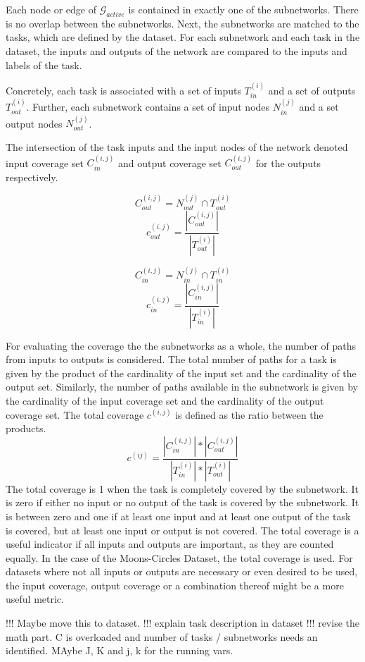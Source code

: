 Each node or edge of $\mathcal{G}_{active}$ is contained in exactly one of the subnetworks.
There is no overlap between the subnetworks.
Next, the subnetworks are matched to the tasks, which are defined by the dataset.
For each subnetwork and each task in the dataset, the inputs and outputs of the network are compared to the inputs and labels of the task.

Concretely, each task is associated with a set of inputs $T^{(i)}_{in}$ and a set of outputs $T^{(i)}_{out}$.
Further, each subnetwork contains a set of input nodes $N^{(j)}_{in}$ and a set output nodes $N^{(j)}_{out}$.

The intersection of the task inputs and the input nodes of the network denoted input coverage set $C^{(i,j)}_{in}$ and output coverage set $C^{(i,j)}_{out}$ for the outputs respectively.

\[
C^{(i,j)}_{out} = N^{(j)}_{out} \cap T^{(i)}_{out}
\]
\[
c^{(i,j)}_{out} = \frac{| C^{(i,j)}_{out} |}{|T^{(i)}_{out}|}
\]

\[
C^{(i,j)}_{in}  = N^{(j)}_{in}  \cap T^{(i)}_{in}
\]
\[
c^{(i,j)}_{in} = \frac{| C^{(i,j)}_{in} |}{|T^{(i)}_{in}|}
\]

For evaluating the coverage the the subnetworks as a whole, the number of paths from inputs to outputs is considered.
The total number of paths for a task is given by the product of the cardinality of the input set and the cardinality of the output set.
Similarly, the number of paths available in the subnetwork is given by the cardinality of the input coverage set and the cardinality of the output coverage set.
The total coverage $c^{(i,j)}$ is defined as the ratio between the products.
\[
c^{(ij)} = \frac{
    | C^{(i,j)}_{in}| * | C^{(i,j)}_{out} |
    }{
    |T^{(i)}_{in}| * |T^{(i)}_{out}|
}
\]
The total coverage is 1 when the task is completely covered by the subnetwork.
It is zero if either no input or no output of the task is covered by the subnetwork.
It is between zero and one if at least one input and at least one output of the task is covered, but at least one input or output is not covered.
The total coverage is a useful indicator if all inputs and outputs are important, as they are counted equally.
In the case of the Moons-Circles Dataset, the total coverage is used.
For datasets where not all inputs or outputs are necessary or even desired to be used, the input coverage, output coverage or a combination thereof might be a more useful metric.

!!! Maybe move this to dataset.
!!! explain task description in dataset
!!! revise the math part. C is overloaded and number of tasks / subnetworks needs an identified. MAybe J, K and j, k for the running vars.

